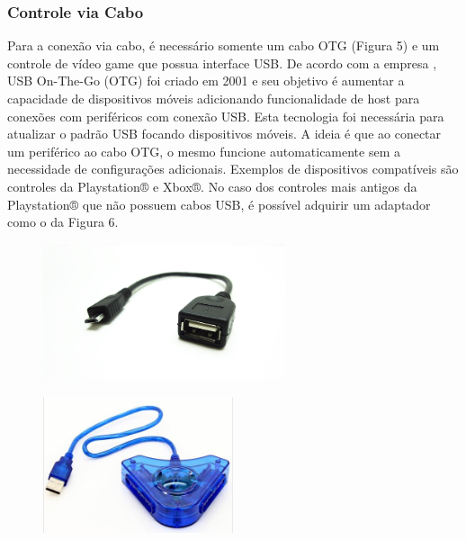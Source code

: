 \subsubsection{Controle via Cabo}
\label{ss.cabo}

Para a conexão via cabo, é necessário somente um cabo OTG (Figura 5) e um controle de vídeo game que possua interface USB. De acordo com a empresa , USB On-The-Go (OTG) foi criado em 2001 e seu objetivo é aumentar a capacidade de dispositivos móveis adicionando funcionalidade de host para conexões com periféricos com conexão USB. Esta tecnologia foi necessária para atualizar o padrão USB focando dispositivos móveis. A ideia é que ao conectar um periférico ao cabo OTG, o mesmo funcione automaticamente sem a necessidade de configurações adicionais.
Exemplos de dispositivos compatíveis são controles da Playstation® e Xbox®. No caso dos controles mais antigos da Playstation® que não possuem cabos USB, é possível adquirir um adaptador como o da Figura 6.

\begin{figure}[H]
	
	\begin{minipage}{.5\textwidth}{
		\centering
		\includegraphics[height=4cm]{Imagens/otg.png}		
		\label{f.otg}	
	}
	\end{minipage}
	\begin{minipage}{.5\textwidth}{
			\centering
			\includegraphics[height=4cm]{Imagens/adaptador.png}		
			\label{f.adaptador}
		}
	\end{minipage}
	
\end{figure}

